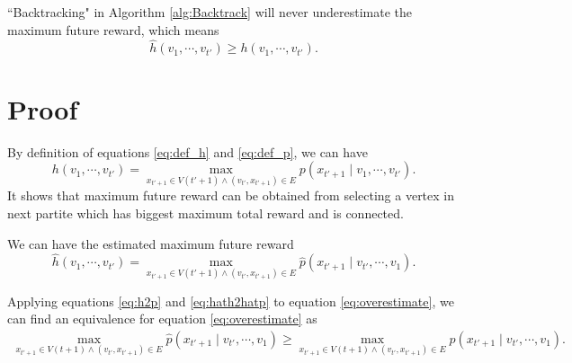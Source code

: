 \documentclass[12pt]{article}
\begin{document}
\begin{thm}
\label{thm:underestimate}
``Backtracking" in Algorithm \ref{alg:Backtrack} will never underestimate the maximum future reward, which means 
\begin{equation}
\label{eq:overestimate}
\hat{h}(v_{1} , \cdots , v_{t'}) \geq h(v_{1} , \cdots , v_{t'}).
\end{equation}
\end{thm}

\section{Proof}

By definition of equations \eqref{eq:def_h} and \eqref{eq:def_p}, we can have 
\begin{equation}
\label{eq:h2p}
h( v_{1} , \cdots , v_{t'} ) = \max_{ x_{t'+1} \in V(t'+1) \land ( v_{t'}, x_{t'+1} ) \in E} p( x_{t'+1} \mid v_{1} , \cdots , v_{t'} ).
\end{equation}
It shows that maximum future reward can be obtained from selecting a vertex in next partite which has biggest maximum total reward and is connected.

We can have the estimated maximum future reward 
\begin{equation}
\label{eq:hath2hatp}
\hat{h}( v_{1} , \cdots , v_{t'} ) = \max_{ x_{t'+1} \in V(t'+1) \land ( v_{t'}, x_{t'+1} ) \in E } \hat{p}( x_{t'+1} \mid v_{t'} , \cdots , v_{1} ).
\end{equation}

Applying equations \eqref{eq:h2p} and \eqref{eq:hath2hatp} to equation \eqref{eq:overestimate}, we can find an equivalence for equation \eqref{eq:overestimate} as
\begin{equation}
\label{eq:inductEnd}
\begin{aligned}
\max_{x_{t'+1} \in V(t+1) \land (v_{t'}, x_{t'+1}) \in E } \hat{p}( x_{t'+1} \mid v_{t'} , \cdots , v_{1} ) \geq \max_{x_{t'+1} \in V(t+1) \land (v_{t'}, x_{t'+1}) \in E } p( x_{t'+1} \mid v_{t'} , \cdots , v_{1} ).
\end{aligned}
\end{equation}
\end{document}
